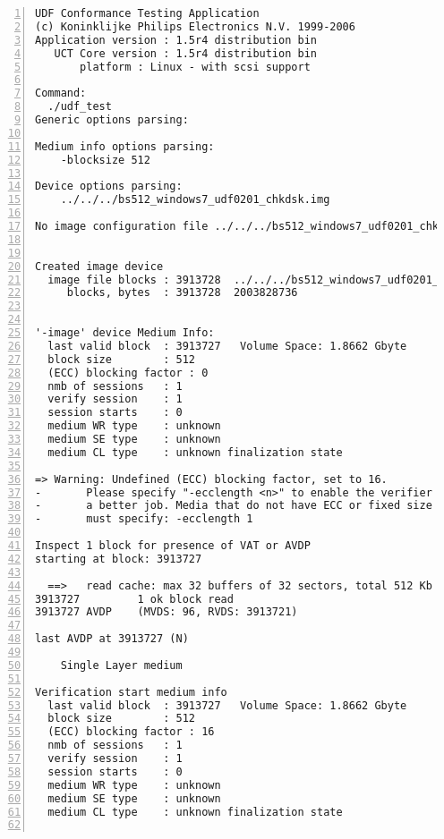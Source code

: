 \begin{lstlisting}[frame=single,caption={Výsledek kontroly poškozeného média referenčním programem \texttt{udfct} po opravě nástrojem \texttt{CHKDSK}},label=lst:udfct-chkdsk,basicstyle=\ttfamily\scriptsize, keywordstyle=\color{black}\bfseries\underbar,nolol,numbers=left,texcl=false,escapechar=!]
UDF Conformance Testing Application
(c) Koninklijke Philips Electronics N.V. 1999-2006
Application version : 1.5r4 distribution bin
   UCT Core version : 1.5r4 distribution bin
       platform : Linux - with scsi support

Command:
  ./udf_test
Generic options parsing:

Medium info options parsing:
    -blocksize 512

Device options parsing:
    ../../../bs512_windows7_udf0201_chkdsk.img

No image configuration file ../../../bs512_windows7_udf0201_chkdsk.cfg


Created image device
  image file blocks : 3913728  ../../../bs512_windows7_udf0201_chkdsk.img
     blocks, bytes  : 3913728  2003828736


'-image' device Medium Info:
  last valid block  : 3913727   Volume Space: 1.8662 Gbyte
  block size        : 512
  (ECC) blocking factor : 0
  nmb of sessions   : 1
  verify session    : 1
  session starts    : 0       
  medium WR type    : unknown
  medium SE type    : unknown
  medium CL type    : unknown finalization state

=> Warning: Undefined (ECC) blocking factor, set to 16.
-       Please specify "-ecclength <n>" to enable the verifier to do
-       a better job. Media that do not have ECC or fixed size packets
-       must specify: -ecclength 1

Inspect 1 block for presence of VAT or AVDP
starting at block: 3913727

  ==>   read cache: max 32 buffers of 32 sectors, total 512 Kb
3913727         1 ok block read
3913727 AVDP    (MVDS: 96, RVDS: 3913721)

last AVDP at 3913727 (N)

    Single Layer medium

Verification start medium info
  last valid block  : 3913727   Volume Space: 1.8662 Gbyte
  block size        : 512
  (ECC) blocking factor : 16
  nmb of sessions   : 1
  verify session    : 1
  session starts    : 0       
  medium WR type    : unknown
  medium SE type    : unknown
  medium CL type    : unknown finalization state


\end{lstlisting}
